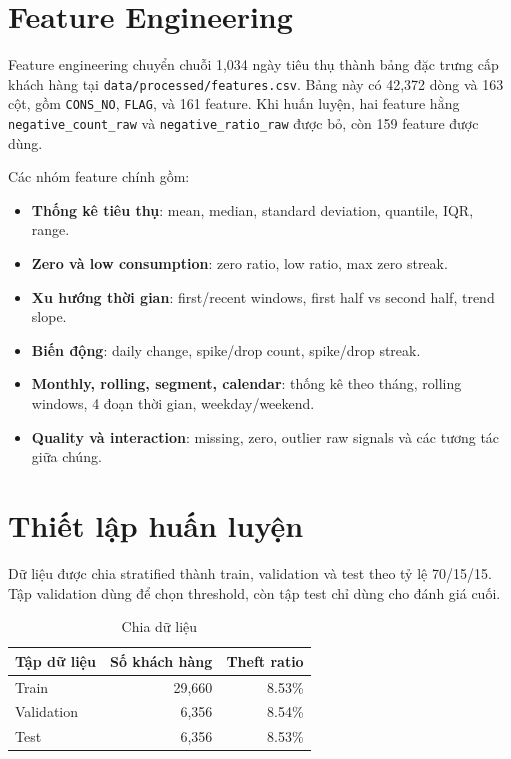 \documentclass[12pt,a4paper]{article}
\begin{document}
\section{Feature Engineering}

Feature engineering chuyển chuỗi 1,034 ngày tiêu thụ thành bảng đặc trưng cấp khách hàng tại \texttt{data/processed/features.csv}. Bảng này có 42,372 dòng và 163 cột, gồm \texttt{CONS\_NO}, \texttt{FLAG}, và 161 feature. Khi huấn luyện, hai feature hằng \texttt{negative\_count\_raw} và \texttt{negative\_ratio\_raw} được bỏ, còn 159 feature được dùng.

Các nhóm feature chính gồm:
\begin{itemize}
    \item \textbf{Thống kê tiêu thụ}: mean, median, standard deviation, quantile, IQR, range.
    \item \textbf{Zero và low consumption}: zero ratio, low ratio, max zero streak.
    \item \textbf{Xu hướng thời gian}: first/recent windows, first half vs second half, trend slope.
    \item \textbf{Biến động}: daily change, spike/drop count, spike/drop streak.
    \item \textbf{Monthly, rolling, segment, calendar}: thống kê theo tháng, rolling windows, 4 đoạn thời gian, weekday/weekend.
    \item \textbf{Quality và interaction}: missing, zero, outlier raw signals và các tương tác giữa chúng.
\end{itemize}

\section{Thiết lập huấn luyện}

Dữ liệu được chia stratified thành train, validation và test theo tỷ lệ 70/15/15. Tập validation dùng để chọn threshold, còn tập test chỉ dùng cho đánh giá cuối.

\begin{table}[h]
\centering
\caption{Chia dữ liệu}
\begin{tabular}{lrr}
\toprule
Tập dữ liệu & Số khách hàng & Theft ratio \\
\midrule
Train & 29,660 & 8.53\% \\
Validation & 6,356 & 8.54\% \\
Test & 6,356 & 8.53\% \\
\bottomrule
\end{tabular}
\end{table}
\end{document}
